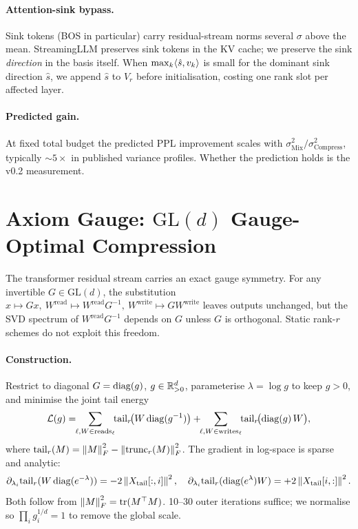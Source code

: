\documentclass[11pt]{article}
\begin{document}
\paragraph{Attention-sink bypass.}  Sink tokens (BOS in particular) carry
residual-stream norms several $\sigma$ above the mean.  StreamingLLM
\cite{xiao2023streamingllm} preserves sink tokens in the KV cache; we
preserve the sink \emph{direction} in the basis itself.  When
$\max_k\langle \hat s, v_k \rangle$ is small for the dominant sink direction
$\hat s$, we append $\hat s$ to $V_r$ before initialisation, costing one
rank slot per affected layer.

\paragraph{Predicted gain.}  At fixed total budget the predicted PPL
improvement scales with $\sigma^2_\text{Mix}/\sigma^2_\text{Compress}$,
typically $\sim 5\times$ in published variance profiles.  Whether the
prediction holds is the v0.2 measurement.

\section{Axiom Gauge: $\mathrm{GL}(d)$ Gauge-Optimal Compression}
\label{sec:gauge}
The transformer residual stream carries an exact gauge symmetry.  For any
invertible $G\in\mathrm{GL}(d)$, the substitution
$x\!\mapsto\!Gx,\ W^\text{read}\!\mapsto\!W^\text{read}G^{-1},\
W^\text{write}\!\mapsto\!GW^\text{write}$ leaves outputs unchanged, but
the SVD spectrum of $W^\text{read}G^{-1}$ depends on $G$ unless $G$ is
orthogonal.  Static rank-$r$ schemes do not exploit this freedom.

\paragraph{Construction.}  Restrict to diagonal $G=\operatorname{diag}(g)$, $g\in\mathbb{R}^d_{>0}$,
parameterise $\lambda=\log g$ to keep $g>0$, and minimise the joint tail
energy
\[
\mathcal{L}(g)=\!\!\sum_{\ell,W\in\text{reads}_\ell}\!\!\mathrm{tail}_r\!\bigl(W\diag(g^{-1})\bigr)
+\!\!\sum_{\ell,W\in\text{writes}_\ell}\!\!\mathrm{tail}_r\!\bigl(\diag(g)\,W\bigr),
\]
where $\mathrm{tail}_r(M)=\left\lVert M \right\rVert_F^2-\left\lVert \mathrm{trunc}_r(M) \right\rVert_F^2$.  The
gradient in log-space is sparse and analytic:
\[
\partial_{\lambda_i}\mathrm{tail}_r(W\operatorname{diag}(e^{-\lambda}))=-2\left\lVert X_\text{tail}[:,i] \right\rVert^2,\quad
\partial_{\lambda_i}\mathrm{tail}_r(\operatorname{diag}(e^{\lambda})W)=+2\left\lVert X_\text{tail}[i,:] \right\rVert^2.
\]
Both follow from $\left\lVert M \right\rVert_F^2=\operatorname{tr}(M^\top M)$.  10--30 outer iterations
suffice; we normalise so $\prod_i g_i^{1/d}=1$ to remove the global scale.
\end{document}
